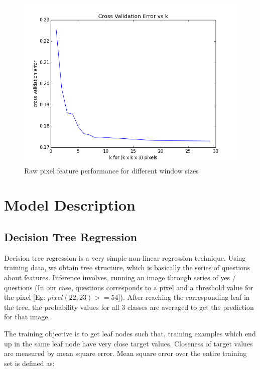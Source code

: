 \documentclass[10pt]{article}
\begin{document}
\begin{figure}[H]
\begin{center}
\includegraphics[scale=0.4]{images/find_k_cv.jpg}
\caption{Raw pixel feature performance for different window sizes}
\end{center}
\label{fig:raweval}
\end{figure}

\section*{Model Description}

\subsection*{Decision Tree Regression}
Decision tree regression is a very simple non-linear regression technique. Using training data, we obtain tree structure, which is basically the series of questions about features. Inference involves, running an image through series of yes / questions (In our case, questions corresponds to a pixel and a threshold value for the pixel [Eg: $pixel(22, 23) >= 54$]). After reaching the corresponding leaf in the tree, the probability values for all 3 classes are averaged to get the prediction for that image.   

The training objective is to get leaf nodes such that, training examples which end up in the same leaf node have very close target values. Closeness of target values are measured by mean square error. Mean square error over the entire training set is defined as:
\end{document}
